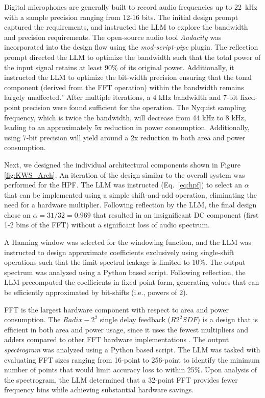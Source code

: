 Digital microphones are generally built to record audio frequencies up to 22~kHz with a sample precision ranging from 12-16 bits. The initial design prompt captured the requirements, and instructed the LLM to explore the bandwidth and precision requirements. The open-source audio tool \textit{Audacity} was incorporated into the design flow using the \textit{ mod-script-pipe} plugin. The reflection prompt directed the LLM to optimize the bandwidth such that the total power of the input signal retains at least 90\% of its original power. Additionally, it instructed the LLM to optimize the bit-width precision ensuring that the tonal component (derived from the FFT operation) within the bandwidth remains largely unaffected."
 After multiple iterations, a 4 kHz bandwidth and 7-bit fixed-point precision were found sufficient for the operation. The Nyquist sampling frequency, which is twice the bandwidth, will decrease from 44 kHz to 8 kHz, leading to an approximately 5x reduction in power consumption. Additionally, using 7-bit precision will yield around a 2x reduction in both area and power consumption.

Next, we designed the individual architectural components shown in Figure \ref{fig:KWS_Arch}. An iteration of the design similar to the overall system was performed for the HPF. The LLM was instructed (Eq.~\ref{eq:hpf}) to select an $\alpha$ that can be implemented using a simple shift-and-add operation, eliminating the need for a hardware multiplier. Following reflection by the LLM, the final design chose an $\alpha = 31/32 = 0.969$ that resulted in an insignificant DC component (first 1-2 bins of the FFT) without a significant loss of audio spectrum. 

A Hanning window was selected for the windowing function, and the LLM was instructed to design approximate coefficients exclusively using single-shift operations such that the limit spectral leakage is limited to 10\%. The output spectrum was analyzed using a Python based script. Following reflection, the LLM precomputed the coefficients in fixed-point form, generating values that can be efficiently approximated by bit-shifts (i.e., powers of 2).

FFT is the largest hardware component with respect to area and power consumption. The $Radix-2^2$ single delay feedback ($R2^2SDF$) is a design that is efficient in both area and power usage, since it uses the fewest multipliers and adders compared to other FFT hardware implementations \cite{chong20220}. The output \textit{spectrogram} was analyzed using a Python based script. The LLM was tasked with evaluating FFT sizes ranging from 16-point to 256-point to identify the minimum number of points that would limit accuracy loss to within 25\%. Upon analysis of the spectrogram, the LLM determined that a 32-point FFT provides fewer frequency bins while achieving substantial hardware savings.

